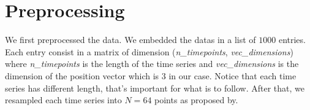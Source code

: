 \section{Preprocessing}

We first preprocessed the data. We embedded the datas in a list of $1000$ entries. Each entry consist in a matrix of dimension (\textit{n\_timepoints}, \textit{vec\_dimensions}) where \textit{n\_timepoints} is the length of the time series and \textit{vec\_dimensions} is the dimension of the position vector which is $3$ in our case. Notice that each time series has different length, that's important for what is to follow. 
After that, we resampled each time series into $N = 64$ points as proposed by\cite[text]{}.

